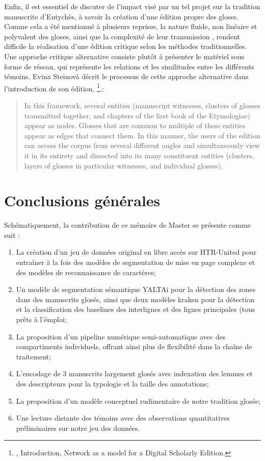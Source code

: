\documentclass[a4paper, twoside, 12pt]{book}
\begin{document}
{Enfin, il est essentiel de discuter de l'impact visé par un tel projet sur la tradition manuscrite d'Eutychès, à savoir la création d'une édition propre des gloses. Comme cela a été mentionné à plusieurs reprises, la nature fluide, non linéaire et polyvalent des gloses, ainsi que la complexité de leur transmission , rendent difficile la réalisation d'une édition critique selon les méthodes traditionnelles. Une approche critique alternative consiste plutôt à présenter le matériel sous forme de réseau, qui représente les relations et les similitudes entre les différents témoins. Evina Steinovà décrit le processus de cette approche alternative dans l'introduction de son édition, \footnote{\cite{steinova2021glosses}, Introduction, Network as a model for a Digital Scholarly Edition.}.:

\blockquote{In this framework, several entities (manuscript witnesses, clusters of glosses transmitted together, and chapters of the first book of the Etymologiae) appear as nodes. Glosses that are common to multiple of these entities appear as edges that connect them. In this manner, the users of the edition can access the corpus from several different angles and simultaneously view it in its entirety and dissected into its many constituent entities (clusters, layers of glosses in particular witnesses, and individual glosses).}


\section{Conclusions générales}

Schématiquement, la contribution de ce mémoire de Master se présente comme suit :

\begin{enumerate}
\item La création d'un jeu de données original en libre accès sur HTR-United pour entraîner à la fois des modèles de segmentation de mise en page complexe et des modèles de reconnaissance de caractères;
\item Un modèle de segmentation sémantique YALTAi pour la détection des zones dans des manuscrits glosés, ainsi que deux modèles kraken pour la détection et la classification des baselines des interlignes et des lignes principales (tous prêts à l'émploi;
\item La proposition d'un pipeline numérique semi-automatique avec des compartiments individuels, offrant ainsi plus de flexibilité dans la chaîne de traitement;
\item L'encodage de 3 manuscrits largement glosés avec indexation des lemmes et des descripteurs pour la typologie et la taille des annotations;
\item La proposition d'un modèle conceptuel rudimentaire de notre tradition glosée;
\item Une lecture distante des témoins avec des observations quantitatives préliminaires sur notre jeu des données.
\end{enumerate}

}
\end{document}
